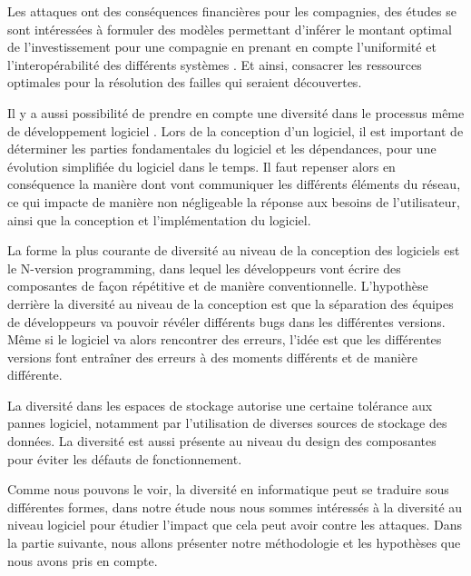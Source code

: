 Les attaques ont des conséquences financières pour les compagnies, des études se sont intéressées à formuler des modèles permettant d’inférer le montant optimal de l’investissement pour une compagnie en prenant en compte l’uniformité et l’interopérabilité des différents systèmes \cite{informationSecurity}. Et ainsi, consacrer les ressources optimales pour la résolution des failles qui seraient découvertes. 

Il y a aussi possibilité de prendre en compte une diversité dans le processus même de développement logiciel \cite{processDiversity}. 
Lors de la conception d’un logiciel, il est important de déterminer les parties fondamentales du logiciel et les dépendances, pour une évolution simplifiée du logiciel dans le temps. Il faut repenser alors en conséquence la manière dont vont communiquer les différents éléments du réseau, ce qui impacte de manière non négligeable la réponse aux besoins de l'utilisateur, ainsi que la conception et l'implémentation du logiciel.

La forme la plus courante de diversité au niveau de la conception des logiciels est le N-version programming\cite{ NversionProgramming }, dans lequel les développeurs vont écrire des composantes de façon répétitive et de manière conventionnelle. L’hypothèse derrière la diversité au niveau de la conception est que la séparation des équipes de développeurs va pouvoir révéler différents bugs dans les différentes versions. Même si le logiciel va alors rencontrer des erreurs, l’idée est que les différentes versions font entraîner des erreurs à des moments différents et de manière différente. 

La diversité dans les espaces de stockage autorise une certaine tolérance aux pannes logiciel\cite{dataDiversity}, notamment par l'utilisation de diverses sources de stockage des données. La diversité est aussi présente au niveau du design des composantes pour éviter les défauts de fonctionnement\cite{SecurityThroughDiversity}.

Comme nous pouvons le voir, la diversité en informatique peut se traduire sous différentes formes, dans notre étude nous nous sommes intéressés à la diversité au niveau logiciel pour étudier l'impact que cela peut avoir contre les attaques. Dans la partie suivante, nous allons présenter notre méthodologie et les hypothèses que nous avons pris en compte. 

